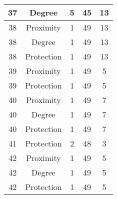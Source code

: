 \documentclass[results.tex]{subfiles}
\begin{document}
\begin{center}
\begin{tabular}{| c || c | c | c | c |}
            \hline
            37                      & Degree                       & 5                      & 45                      & 13                   \\
            \hline
            38                      & Proximity                    & 1                      & 49                      & 13                   \\
            \hline
            38                      & Degree                       & 1                      & 49                      & 13                   \\
            \hline
            38                      & Protection                   & 1                      & 49                      & 13                   \\
            \hline
            39                      & Proximity                    & 1                      & 49                      & 5                    \\
            \hline
            39                      & Protection                   & 1                      & 49                      & 5                    \\
            \hline
            40                      & Proximity                    & 1                      & 49                      & 7                    \\
            \hline
            40                      & Degree                       & 1                      & 49                      & 7                    \\
            \hline
            40                      & Protection                   & 1                      & 49                      & 7                    \\
            \hline
            41                      & Protection                   & 2                      & 48                      & 3                    \\
            \hline
            42                      & Proximity                    & 1                      & 49                      & 5                    \\
            \hline
            42                      & Degree                       & 1                      & 49                      & 5                    \\
            \hline
            42                      & Protection                   & 1                      & 49                      & 5                    \\

\end{tabular}
\end{center}
\end{document}
